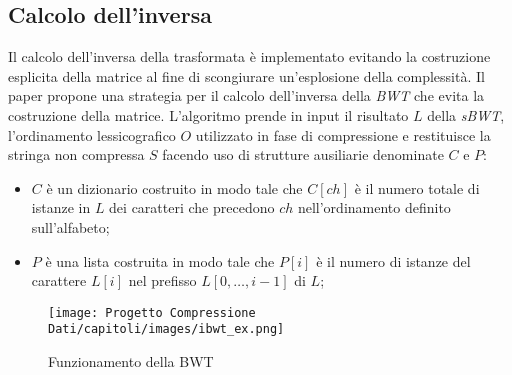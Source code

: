\subsection{Calcolo dell'inversa} { 
Il calcolo dell'inversa della trasformata è implementato evitando la costruzione esplicita della matrice al fine di scongiurare un'esplosione della complessità. Il paper \cite{burrows1994block} propone una strategia per il calcolo dell'inversa della \emph{BWT} che evita la costruzione della matrice. L'algoritmo prende in input il risultato $L$ della \emph{sBWT}, l'ordinamento lessicografico $O$ utilizzato in fase di compressione e restituisce la stringa non compressa $S$ facendo uso di strutture ausiliarie denominate $C$ e $P$:
\begin{itemize}
    \item $C$ è un dizionario costruito in modo tale che $C[ch]$ è il numero totale di istanze in $L$ dei caratteri che precedono $ch$ nell'ordinamento definito sull'alfabeto;
    \item $P$ è una lista costruita in modo tale che $P[i]$ è il numero di istanze del carattere $L[i]$ nel prefisso $L[0,\dots,i-1]$ di $L$;
\end{itemize}
\begin{figure}[h]
    \centering
    \texttt{[image: Progetto Compressione Dati/capitoli/images/ibwt\_ex.png]}
\caption{Funzionamento della BWT}
    \label{fig:ibwt_ex}
\end{figure} 
{ 
}}
